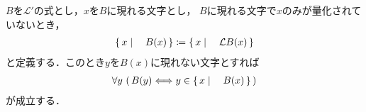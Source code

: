 	$B$を$\mathcal{L}'$の式とし，$x$を$B$に現れる文字とし，
	$B$に現れる文字で$x$のみが量化されていないとき，
	\begin{align}
		\left\{\, x \mid \quad B(x)\, \right\} \coloneqq \left\{\, x \mid \quad \mathcal{L}B(x)\, \right\}
	\end{align}
	と定義する．このとき$y$を$B(x)$に現れない文字とすれば
	\begin{align}
		\forall y\, \left(\, B(y) \Longleftrightarrow y \in \left\{\, x \mid \quad B(x)\, \right\}\, \right)
	\end{align}
	が成立する．
	